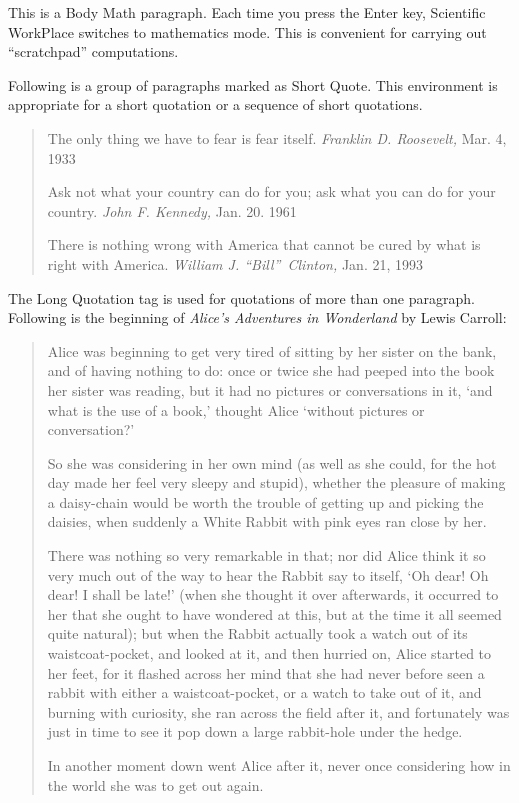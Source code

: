 \documentclass{amsbook}
\theoremstyle{plain}
\numberwithin{equation}{chapter}
\begin{document}
This is a Body Math paragraph. Each time you press the Enter key, Scientific
WorkPlace switches to mathematics mode. This is convenient for carrying out
``scratchpad'' computations.

Following is a group of paragraphs marked as Short Quote. This environment is
appropriate for a short quotation or a sequence of short quotations.

\begin{quote}
The only thing we have to fear is fear itself. \emph{Franklin D. Roosevelt, }%
Mar. 4, 1933

Ask not what your country can do for you; ask what you can do for your
country. \emph{John F. Kennedy, }Jan. 20. 1961

There is nothing wrong with America that cannot be cured by what is right
with America. \emph{William J. \textquotedblleft Bill\textquotedblright\
Clinton, }Jan. 21, 1993
\end{quote}

The Long Quotation tag is used for quotations of more than one paragraph.
Following is the beginning of \emph{Alice's Adventures in Wonderland }by
Lewis Carroll:

\begin{quotation}
Alice was beginning to get very tired of sitting by her sister on the bank,
and of having nothing to do: once or twice she had peeped into the book her
sister was reading, but it had no pictures or conversations in it, `and what
is the use of a book,' thought Alice `without pictures or conversation?'

So she was considering in her own mind (as well as she could, for the hot
day made her feel very sleepy and stupid), whether the pleasure of making a
daisy-chain would be worth the trouble of getting up and picking the
daisies, when suddenly a White Rabbit with pink eyes ran close by her.

There was nothing so very remarkable in that; nor did Alice think it so very
much out of the way to hear the Rabbit say to itself, `Oh dear! Oh dear! I
shall be late!' (when she thought it over afterwards, it occurred to her
that she ought to have wondered at this, but at the time it all seemed quite
natural); but when the Rabbit actually took a watch out of its
waistcoat-pocket, and looked at it, and then hurried on, Alice started to
her feet, for it flashed across her mind that she had never before seen a
rabbit with either a waistcoat-pocket, or a watch to take out of it, and
burning with curiosity, she ran across the field after it, and fortunately
was just in time to see it pop down a large rabbit-hole under the hedge.

In another moment down went Alice after it, never once considering how in
the world she was to get out again.
\end{quotation}
\end{document}
